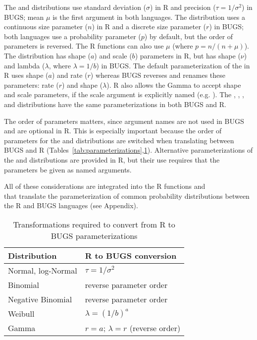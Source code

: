 The  and  distributions use standard deviation ($\sigma$) in R and precision ($\tau=1/\sigma^2$) in BUGS; mean $\mu$ is the first argument in both languages.
The  distribution uses a continuous size parameter ($n$) in R and a discrete size parameter ($r$) in BUGS; both languages use a probability parameter ($p$) by default, but the order of parameters is reversed. 
The R functions  can also use $\mu$ (where $p=n/(n+\mu)$).
The  distribution has shape ($a$) and scale ($b$) parameters in R, but has shape ($\nu$) and lambda ($\lambda$, where $\lambda=1/b$) in BUGS.
The default parameterization of the  in R uses shape ($a$) and rate ($r$) whereas BUGS reverses and renames these parameters: rate ($r$) and shape ($\lambda$).
R also allows the Gamma to accept shape and scale parameters, if the scale argument is explicitly named (e.g. ).
The , , , and  distributions have the same parameterizations in both BUGS and R.

The order of parameters matters, since argument names are not used in BUGS and are optional in R.
This is especially important because the order of parameters for the  and  distributions are switched when translating between BUGS and R (Tables~\ref{tab:parameterizations},\ref{tab:transformations}).
Alternative parameterizations of the  and  distributions are provided in R, but their use requires that the parameters be given as named arguments.

All of these considerations are integrated into the R functions  and \\  that translate the parameterization of common probability distributions between the R and BUGS languages (see Appendix).

\begin{table}
\begin{center}
\begin{tabular}{ll}
\toprule
Distribution        &  R to BUGS conversion                      \\
\midrule
Normal, log-Normal  &  $\tau = 1/\sigma^2$                   \\
Binomial            &  reverse parameter order                \\
Negative Binomial   &  reverse parameter order \\
Weibull             &  $\lambda = (1/b)^{a}$  \\
Gamma               &  $r = a$; $\lambda = r$ (reverse order)                           \\
\bottomrule
\end{tabular}
\end{center}
\caption{Transformations required to convert from R to BUGS parameterizations}
\label{tab:transformations}
\end{table}

